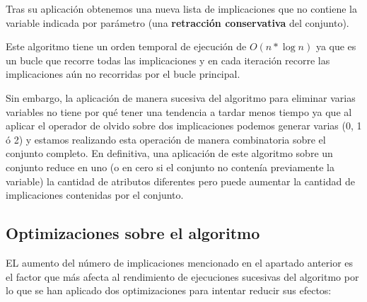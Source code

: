 	
	Tras su aplicación obtenemos una nueva lista de implicaciones que no contiene la variable indicada por parámetro (una \textbf{retracción conservativa} del conjunto).
	
	Este algoritmo tiene un orden temporal de ejecución de $O(n*\log{n})$ ya que es un bucle que recorre todas las implicaciones y en cada iteración recorre las implicaciones aún no recorridas por el bucle principal. 
	
	Sin embargo, la aplicación de manera sucesiva del algoritmo para eliminar varias variables no tiene por qué tener una tendencia a tardar menos tiempo ya que al aplicar el operador de olvido sobre dos implicaciones podemos generar varias (0, 1 ó 2) y estamos realizando esta operación de manera combinatoria sobre el conjunto completo. En definitiva, una aplicación de este algoritmo sobre un conjunto reduce en uno (o en cero si el conjunto no contenía previamente la variable) la cantidad de atributos diferentes pero puede aumentar la cantidad de implicaciones contenidas por el conjunto. 
	


\subsection*{Optimizaciones sobre el algoritmo}
	
	EL aumento del número de implicaciones mencionado en el apartado anterior es el factor que más afecta al rendimiento de ejecuciones sucesivas del algoritmo por lo que se han aplicado dos optimizaciones para intentar reducir sus efectos:

